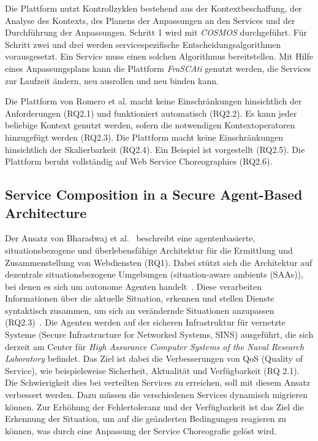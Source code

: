 \documentclass[conference,compsoc,ngerman]{IEEEtran}
\begin{document}
Die Plattform nutzt Kontrollzyklen bestehend aus der Kontextbeschaffung, der Analyse des Kontexts, des Planens der Anpassungen an den Services und der Durchführung der Anpassungen. Schritt 1 wird mit \textit{COSMOS} durchgeführt. Für Schritt zwei und drei werden servicespezifische Entscheidungsalgorithmen vorausgesetzt. Ein Service muss einen solchen Algorithmus bereitstellen. Mit Hilfe eines Anpassungsplans kann die Plattform \textit{FraSCAti} genutzt werden, die Services zur Laufzeit ändern, neu ausrollen und neu binden kann.

Die Plattform von Romero et al. \cite{RRS10} macht keine Einschränkungen hinsichtlich der Anforderungen (RQ2.1) und funktioniert automatisch (RQ2.2). Es kann jeder beliebige Kontext genutzt werden, sofern die notwendigen Kontextoperatoren hinzugefügt werden (RQ2.3). Die Plattform macht keine Einschränkungen hinsichtlich der Skalierbarkeit (RQ2.4). Ein Beispiel ist vorgestellt (RQ2.5). Die Plattform beruht vollständig auf Web Service Choreographies (RQ2.6).

\subsection{Service Composition in a Secure Agent-Based Architecture}
Der Ansatz von Bharadwaj et al.~\cite{bharadwaj2005service} beschreibt eine agentenbasierte, situationsbezogene und überlebensfähige Architektur für die Ermittlung und Zusammenstellung von Webdiensten (RQ1). Dabei stützt sich die Architektur auf dezentrale situationsbezogene Umgebungen (situation-aware ambients (SAAs)), bei denen es sich um autonome Agenten handelt~\cite{bharadwaj2005service}. Diese verarbeiten Informationen über die aktuelle Situation, erkennen und stellen Dienste syntaktisch zusammen, um sich an verändernde Situationen anzupassen (RQ2.3)~\cite{bharadwaj2005service}. Die Agenten werden auf der sicheren Infrastruktur für vernetzte Systeme (Secure Infrastructure for Networked Systems, SINS) ausgeführt, die sich derzeit am Center für \textit{High Assurance Computer Systems of the Naval Research Laboratory} befindet. 
Das Ziel ist dabei die Verbesserungen von QoS (Quality of Service), wie beispielsweise Sicherheit, Aktualität und Verfügbarkeit (RQ 2.1). Die Schwierigkeit dies bei verteilten Services zu erreichen, soll mit diesem Ansatz verbessert werden. Dazu müssen die verschiedenen Services dynamisch migrieren können. Zur Erhöhung der Fehlertoleranz und der Verfügbarkeit ist das Ziel die Erkennung der Situation, um auf die geänderten Bedingungen reagieren zu können, was durch eine Anpassung der Service Choreografie gelöst wird.
\end{document}
